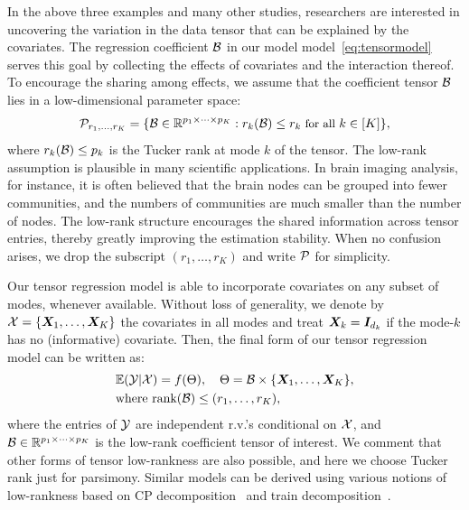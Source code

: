 \documentclass[12pt]{article}
\theoremstyle{plain}
\theoremstyle{definition}
\begin{document}
In the above three examples and many other studies, researchers are interested in uncovering the variation in the data tensor that can be explained by the covariates. The regression coefficient $\mathcal{B}$ in our model model~\eqref{eq:tensormodel} serves this goal by collecting the effects of covariates and the interaction thereof.  
To encourage the sharing among effects, we assume that the coefficient tensor $\mathcal{B}$ lies in a low-dimensional parameter space:
\begin{equation}\label{eq:rank}
\small \mathcal{P}_{r_1,\ldots,r_K}=\{\mathcal{B}\in\mathbb{R}^{p_1\times \cdots \times p_K}: r_k(\mathcal{B})\leq r_k \text{ for all } k\in[K]\},
\end{equation}
where $r_k(\mathcal{B})\leq p_k$ is the Tucker rank at mode $k$ of the tensor. The low-rank assumption is plausible in many scientific applications. In brain imaging analysis, for instance, it is often believed that the brain nodes can be grouped into fewer communities, and the numbers of communities are much smaller than the number of nodes. The low-rank structure encourages the shared information across tensor entries, thereby greatly improving the estimation stability. When no confusion arises, we drop the subscript $(r_1,\ldots,r_K)$ and write $\mathcal{P}$ for simplicity.

Our tensor regression model is able to incorporate covariates on any subset of modes, whenever available. Without loss of generality, we denote by $\mathcal{X}=\{\bm X_1,\ldots,\bm X_K\}$ the covariates in all modes and treat $\bm X_k=\bm I_{d_k}$ if the mode-$k$ has no (informative) covariate. Then, the final form of our tensor regression model can be written as:
\begin{align}\label{eq:tensormodel2}
&\mathbb{E}(\mathcal{Y}|\mathcal{X})=f(\Theta),\quad \Theta =\mathcal{B}\times\{\bm X_1,\ldots,\bm X_K\},\notag\\
&\text{where}\ \text{rank}(\mathcal{B})\leq (r_1,\ldots,r_K),
\end{align}
where the entries of $\mathcal{Y}$ are independent r.v.'s conditional on $\mathcal{X}$, and $\mathcal{B}\in\mathbb{R}^{p_1\times \cdots\times p_K}$ is the low-rank coefficient tensor of interest. We comment that other forms of tensor low-rankness are also possible, and here we choose Tucker rank just for parsimony. Similar models can be derived using various notions of low-rankness based on CP decomposition~\citep{hitchcock1927expression} and train decomposition~\citep{oseledets2011tensor}. 
\end{document}
